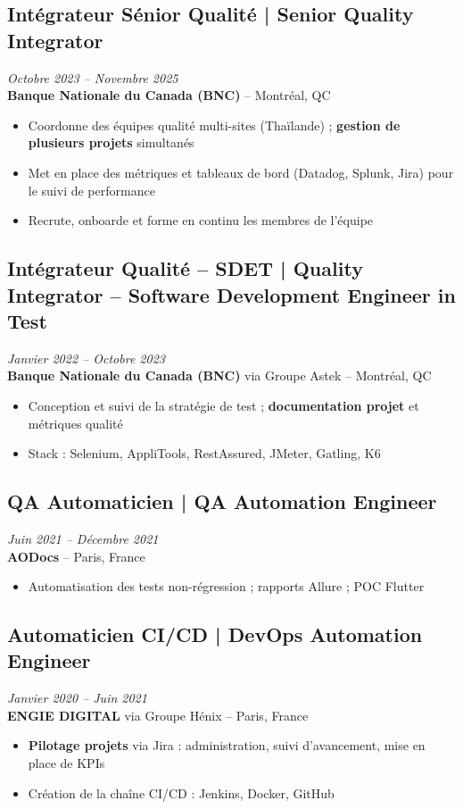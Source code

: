 \documentclass[11pt,a4paper]{article}
\begin{document}
\subsection*{Intégrateur Sénior Qualité | Senior Quality Integrator} \hfill \textit{Octobre 2023 -- Novembre 2025}\\
\textbf{Banque Nationale du Canada (BNC)} -- Montréal, QC
\begin{itemize}
    \item Coordonne des équipes qualité multi-sites (Thaïlande) ; \textbf{gestion de plusieurs projets} simultanés
    \item Met en place des métriques et tableaux de bord (Datadog, Splunk, Jira) pour le suivi de performance
    \item Recrute, onboarde et forme en continu les membres de l'équipe
\end{itemize}

\subsection*{Intégrateur Qualité -- SDET | Quality Integrator -- Software Development Engineer in Test} \hfill \textit{Janvier 2022 -- Octobre 2023}\\
\textbf{Banque Nationale du Canada (BNC)} via Groupe Astek -- Montréal, QC
\begin{itemize}
    \item Conception et suivi de la stratégie de test ; \textbf{documentation projet} et métriques qualité
    \item Stack : Selenium, AppliTools, RestAssured, JMeter, Gatling, K6
\end{itemize}

\subsection*{QA Automaticien | QA Automation Engineer} \hfill \textit{Juin 2021 -- Décembre 2021}\\
\textbf{AODocs} -- Paris, France
\begin{itemize}
    \item Automatisation des tests non-régression ; rapports Allure ; POC Flutter
\end{itemize}

\subsection*{Automaticien CI/CD | DevOps Automation Engineer} \hfill \textit{Janvier 2020 -- Juin 2021}\\
\textbf{ENGIE DIGITAL} via Groupe Hénix -- Paris, France
\begin{itemize}
    \item \textbf{Pilotage projets} via Jira : administration, suivi d'avancement, mise en place de KPIs
    \item Création de la chaîne CI/CD : Jenkins, Docker, GitHub
\end{itemize}
\end{document}
